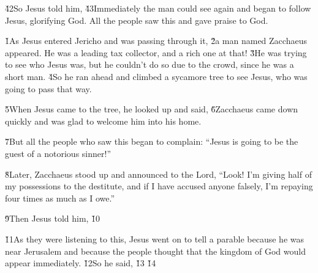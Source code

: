 \v{42}So Jesus told him,  \v{43}Immediately the man could see again and began to follow Jesus, glorifying God. All the people saw this and gave praise to God.

\v{1}As Jesus entered Jericho and was passing through it, \v{2}a man named Zacchaeus appeared. He was a leading tax collector, and a rich one at that! \v{3}He was trying to see who Jesus was, but he couldn't do so due to the crowd, since he was a short man. \v{4}So he ran ahead and climbed a sycamore tree to see Jesus, who was going to pass that way.

\v{5}When Jesus came to the tree, he looked up and said,  \v{6}Zacchaeus came down quickly and was glad to welcome him into his home.

\v{7}But all the people who saw this began to complain: ``Jesus is going to be the guest of a notorious sinner!''

\v{8}Later, Zacchaeus stood up and announced to the Lord, ``Look! I'm giving half of my possessions to the destitute, and if I have accused anyone falsely, I'm repaying four times as much as I owe.''

\v{9}Then Jesus told him,  \v{10}

\v{11}As they were listening to this, Jesus went on to tell a parable because he was near Jerusalem and because the people thought that the kingdom of God would appear immediately. \v{12}So he said,  \v{13} \v{14}

